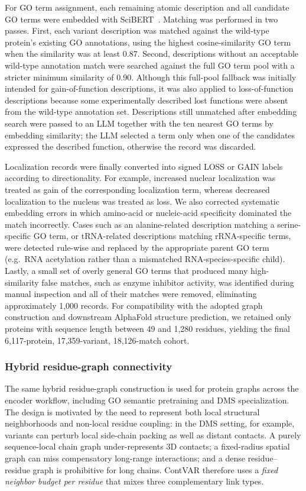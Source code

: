 \documentclass[11pt,a4paper]{article}
\begin{document}
For GO term assignment, each remaining atomic description and all candidate GO terms were embedded with SciBERT~\cite{beltagy2019scibert}. Matching was performed in two passes. First, each variant description was matched against the wild-type protein's existing GO annotations, using the highest cosine-similarity GO term when the similarity was at least 0.87. Second, descriptions without an acceptable wild-type annotation match were searched against the full GO term pool with a stricter minimum similarity of 0.90. Although this full-pool fallback was initially intended for gain-of-function descriptions, it was also applied to loss-of-function descriptions because some experimentally described lost functions were absent from the wild-type annotation set. Descriptions still unmatched after embedding search were passed to an LLM together with the ten nearest GO terms by embedding similarity; the LLM selected a term only when one of the candidates expressed the described function, otherwise the record was discarded.

Localization records were finally converted into signed LOSS or GAIN labels according to directionality. For example, increased nuclear localization was treated as gain of the corresponding localization term, whereas decreased localization to the nucleus was treated as loss. We also corrected systematic embedding errors in which amino-acid or nucleic-acid specificity dominated the match incorrectly. Cases such as an alanine-related description matching a serine-specific GO term, or tRNA-related descriptions matching rRNA-specific terms, were detected rule-wise and replaced by the appropriate parent GO term (e.g.\ RNA acetylation rather than a mismatched RNA-species-specific child). Lastly, a small set of overly general GO terms that produced many high-similarity false matches, such as enzyme inhibitor activity, was identified during manual inspection and all of their matches were removed, eliminating approximately 1,000 records. For compatibility with the adopted graph construction and downstream AlphaFold structure prediction, we retained only proteins with sequence length between 49 and 1,280 residues, yielding the final 6,117-protein, 17,359-variant, 18,126-match cohort.

\subsubsection{Hybrid residue-graph connectivity}
\label{sec:hybrid-graph}
The same hybrid residue-graph construction is used for protein graphs across the encoder workflow, including GO semantic pretraining and DMS specialization. The design is motivated by the need to represent both local structural neighborhoods and non-local residue coupling: in the DMS setting, for example, variants can perturb local side-chain packing as well as distant contacts. A purely sequence-local chain graph under-represents 3D contacts; a fixed-radius spatial graph can miss compensatory long-range interactions; and a dense residue--residue graph is prohibitive for long chains. ContVAR therefore uses a \emph{fixed neighbor budget per residue} that mixes three complementary link types.
\end{document}
